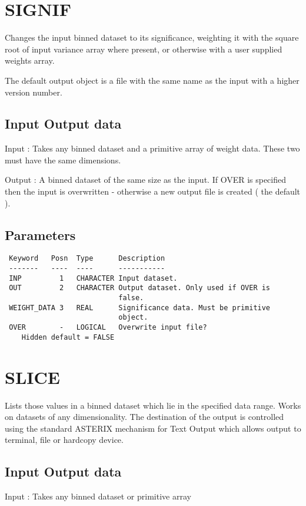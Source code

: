 \documentclass{book}
\renewcommand{\_}{{\tt\char'137}}     %
\begin{document}
\section{SIGNIF}
Changes the input binned dataset to its significance, weighting
it with the square root of input variance array where present,
or otherwise with a user supplied weights array.

The default output object is a file with the same name as the
input with a higher version number.

\subsection{Input Output data}
Input : Takes any binned dataset and a
primitive array of weight data. These
two must have the same dimensions.

Output : A binned dataset of the same size as
the input. If OVER is specified then
the input is overwritten - otherwise
a new output file is created ( the
default ).

\subsection{Parameters}
\begin{verbatim}
 Keyword   Posn  Type      Description
 -------   ----  ----      -----------
 INP         1   CHARACTER Input dataset.
 OUT         2   CHARACTER Output dataset. Only used if OVER is
                           false.
 WEIGHT_DATA 3   REAL      Significance data. Must be primitive
                           object.
 OVER        -   LOGICAL   Overwrite input file?
    Hidden default = FALSE

\end{verbatim}\section{SLICE}
Lists those values in a binned dataset which lie in the specified
data range. Works on datasets of any dimensionality. The destination
of the output is controlled using the standard ASTERIX mechanism
for Text Output which allows output to terminal, file or
hardcopy device.

\subsection{Input Output data}
Input : Takes any binned dataset or primitive array
\end{document}
